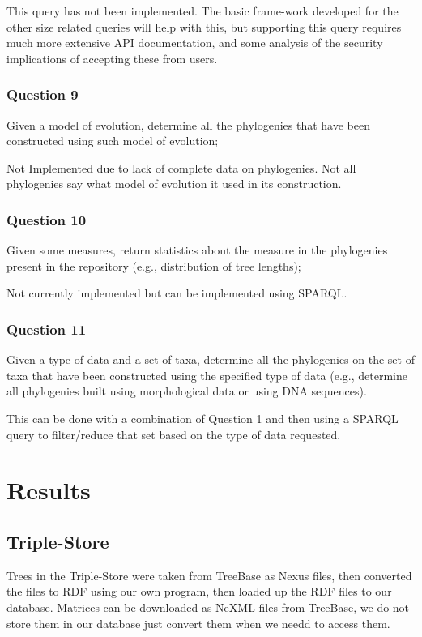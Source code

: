 \documentclass[10pt]{article}
\begin{document}
This query has not been implemented. The basic frame-work developed for the other
size related queries will help with this, but supporting this query requires much
more extensive API documentation, and some analysis of the security implications
of accepting these from users.


\subsubsection{Question 9}
Given a model of evolution, determine all the phylogenies that have been
constructed using such model of evolution;


Not Implemented due to lack of complete data on phylogenies.  Not all
phylogenies say what model of evolution it used in its construction.

\subsubsection{Question 10}
Given some measures, return statistics about the measure in the phylogenies
present in the repository (e.g., distribution of tree lengths);


Not currently implemented but can be implemented using SPARQL.

\subsubsection{Question 11}
Given a type of data and a set of taxa, determine all the phylogenies on the
set of taxa that have been constructed using the specified type of data (e.g.,
determine all phylogenies built using morphological data or using DNA
sequences).	


This can be done with a combination of Question 1 and then using a SPARQL query
to filter/reduce that set based on the type of data requested.

\section{Results}

\subsection{Triple-Store}

Trees in the Triple-Store were taken from TreeBase as Nexus files, then
converted the files to RDF using our own program, then loaded up the RDF files
to our database.  Matrices can be downloaded as NeXML files from TreeBase, we
do not store them in our database just convert them when we needd to access
them.
\end{document}
